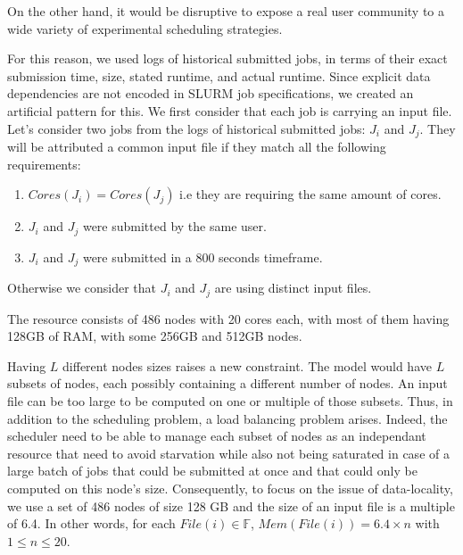 \documentclass[conference,10pt]{IEEEtran}
\newcommand{\file}{\ensuremath{\mathit{File}}\xspace}
\newcommand{\memory}{\ensuremath{\mathit{Mem}}\xspace}
\newcommand{\core}{\mathit{Cores}\xspace}
\newcommand{\fileset}{\ensuremath{\mathbb{F}}\xspace}
\begin{document}
On the other hand, it would be disruptive to expose a real user community to a wide variety of experimental scheduling strategies.

For this reason, we used logs of historical submitted jobs, in terms of their exact submission time, size, stated runtime, and actual runtime.
Since explicit data dependencies are not encoded in SLURM job specifications, we created an artificial pattern for this. 
We first consider that each job is carrying an input file.
Let's consider two jobs from the logs of historical submitted jobs: $J_i$ and $J_j$.
They will be attributed a common input file if they match all the following requirements:
\begin{enumerate}
	\item $\core(J_i) = \core(J_j)$ i.e they are requiring the same amount of cores.
	\item $J_i$ and $J_j$ were submitted by the same user.
	\item $J_i$ and $J_j$ were submitted in a 800 seconds timeframe.
\end{enumerate}
Otherwise we consider that $J_i$ and $J_j$ are using distinct input files.

The resource consists of 486 nodes with 20 cores each, with most of them having 128GB of RAM, with some 256GB and 512GB nodes. 

Having $L$ different nodes sizes raises a new constraint. The model would have
$L$ subsets of nodes, each possibly containing a different number of nodes.
An input file can be too large to be computed on one or multiple of those subsets.
Thus, in addition to the scheduling problem, a load balancing problem arises.
Indeed, the scheduler need to be able to manage each subset of nodes as an independant 
resource that need to avoid starvation while also not being saturated in case of a large
batch of jobs that could be submitted at once and that could only be computed on this node's size.
Consequently, to focus on the issue of data-locality, we use a set of 486 nodes of size 
128 GB and the size of an input file is a multiple of 6.4.
In other words, for each $\file(i) \in \fileset$, $\memory(\file(i)) = 6.4 \times n$ with 
$1 \leq n \leq 20$.
\end{document}
